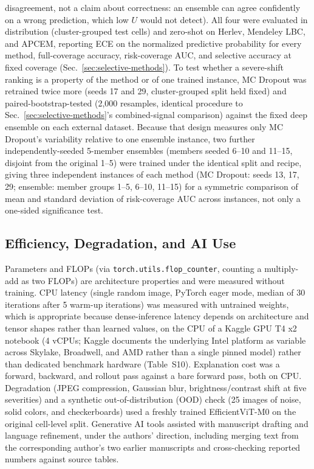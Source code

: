 \documentclass[12pt,letterpaper]{article}
\begin{document}
disagreement, not a claim about correctness: an ensemble can agree confidently on a wrong prediction, which low $U$ would not detect). All four were evaluated in distribution (cluster-grouped test cells) and zero-shot on Herlev, Mendeley LBC, and APCEM, reporting ECE on the normalized predictive probability for every method, full-coverage accuracy, risk-coverage AUC, and selective accuracy at fixed coverage (Sec.~\ref{sec:selective-methods}). To test whether a severe-shift ranking is a property of the method or of one trained instance, MC Dropout was retrained twice more (seeds 17 and 29, cluster-grouped split held fixed) and paired-bootstrap-tested (2,000 resamples, identical procedure to Sec.~\ref{sec:selective-methods}'s combined-signal comparison) against the fixed deep ensemble on each external dataset. Because that design measures only MC Dropout's variability relative to one ensemble instance, two further independently-seeded 5-member ensembles (members seeded 6--10 and 11--15, disjoint from the original 1--5) were trained under the identical split and recipe, giving three independent instances of each method (MC Dropout: seeds 13, 17, 29; ensemble: member groups 1--5, 6--10, 11--15) for a symmetric comparison of mean and standard deviation of risk-coverage AUC across instances, not only a one-sided significance test.

\subsection{Efficiency, Degradation, and AI Use}
\label{sec:eff-methods}
\label{sec:ai}
Parameters and FLOPs (via \texttt{torch.utils.flop\_counter}, counting a multiply-add as two FLOPs) are architecture properties and were measured without training. CPU latency (single random image, PyTorch eager mode, median of 30 iterations after 5 warm-up iterations) was measured with untrained weights, which is appropriate because dense-inference latency depends on architecture and tensor shapes rather than learned values, on the CPU of a Kaggle GPU T4 x2 notebook (4 vCPUs; Kaggle documents the underlying Intel platform as variable across Skylake, Broadwell, and AMD rather than a single pinned model) rather than dedicated benchmark hardware (Table~S10).
Explanation cost was a forward, backward, and rollout pass against a bare forward pass, both on CPU. Degradation (JPEG compression, Gaussian blur, brightness/contrast shift at five severities) and a synthetic out-of-distribution (OOD) check (25 images of noise, solid colors, and checkerboards) used a freshly trained EfficientViT-M0 on the original cell-level split. Generative AI tools assisted with manuscript drafting and language refinement, under the authors' direction, including merging text from the corresponding author's two earlier manuscripts and cross-checking reported numbers against source tables.
\end{document}
